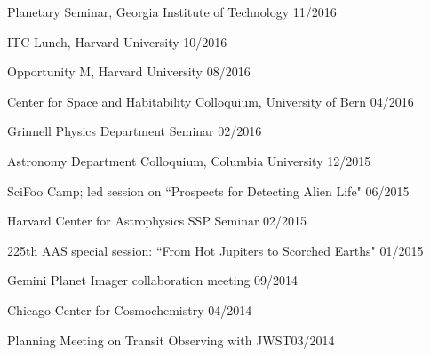 \documentclass[12pt,letterpaper]{article}
\begin{document}
\begin{compactitem}[]
\item {Planetary Seminar, Georgia Institute of Technology \hfill 11/2016}
\item {ITC Lunch, Harvard University \hfill 10/2016}
\item {Opportunity M, Harvard University \hfill 08/2016}
\item {Center for Space and Habitability Colloquium, University of Bern \hfill 04/2016}
\item {Grinnell Physics Department Seminar \hfill 02/2016}
\item {Astronomy Department Colloquium, Columbia University \hfill 12/2015}
\item {SciFoo Camp; led session on ``Prospects for Detecting Alien Life" \hfill 06/2015}
\item {Harvard Center for Astrophysics SSP Seminar \hfill 02/2015}
\item {225th AAS special session: ``From Hot Jupiters to Scorched Earths" \hfill 01/2015}
\item {Gemini Planet Imager collaboration meeting \hfill 09/2014}
\item {Chicago Center for Cosmochemistry \hfill 04/2014}
\item {Planning Meeting on Transit Observing with JWST\hfill 03/2014}
\end{compactitem}
\end{document}
